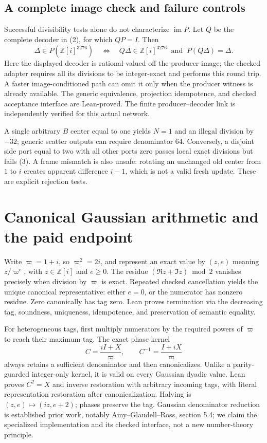 \documentclass[11pt,a4paper]{article}
\newcommand{\Gi}{\mathbb Z[i]}
\newcommand{\pii}{\varpi}
\begin{document}
\subsection*{A complete image check and failure controls}
Successful divisibility tests alone do not characterize $\operatorname{im}P$.
Let $Q$ be the complete decoder in (2), for which $QP=I$. Then
\[
 \Delta\in P(\Gi^{3276})
 \quad\Longleftrightarrow\quad
 Q\Delta\in\Gi^{3276}\ \text{ and }\ P(Q\Delta)=\Delta.\tag{3}
\]
Here the displayed decoder is rational-valued off the producer image;
the checked adapter requires all its divisions to be integer-exact and
performs this round trip. A faster image-conditioned
path can omit it only when the producer witness is already available.
The generic equivalence, projection idempotence, and checked acceptance
interface are Lean-proved. The finite producer--decoder link is independently
verified for this actual network.

A single arbitrary $B$ center equal to one yields $N=1$ and an illegal
division by $-32$; generic scatter outputs can require denominator 64.
Conversely, a disjoint side port equal to two with all other ports zero
passes local exact divisions but fails (3). A frame mismatch is also unsafe:
rotating an unchanged old center from $1$ to $i$ creates apparent difference
$i-1$, which is not a valid fresh update. These are explicit rejection tests.

\section{Canonical Gaussian arithmetic and the paid endpoint}
Write $\pii=1+i$, so $\pii^2=2i$, and represent an exact value by
$(z,e)$ meaning $z/\pii^e$, with $z\in\Gi$ and $e\ge0$.
The residue $(\Re z+\Im z)\bmod2$ vanishes precisely when division by
$\pii$ is exact. Repeated checked cancellation yields the unique canonical
representative: either $e=0$, or the numerator has nonzero residue.
Zero canonically has tag zero. Lean proves termination via the decreasing
tag, soundness, uniqueness, idempotence, and preservation of semantic equality.

For heterogeneous tags, first multiply numerators by the required powers
of $\pii$ to reach their maximum tag. The exact phase kernel
\[
 C=\frac{iI+X}{\pii},\qquad C^{-1}=\frac{I+iX}{\pii}
\]
always retains a sufficient denominator and then canonicalizes. Unlike a
parity-guarded integer-only kernel, it is valid on every Gaussian dyadic
value. Lean proves $C^2=X$ and inverse restoration with arbitrary incoming
tags, with literal representation restoration after canonicalization.
Halving is $(z,e)\mapsto(iz,e+2)$; phases preserve the tag.
Gaussian denominator reduction is established prior work, notably
Amy--Glaudell--Ross, section 5.4; we claim the specialized implementation and
its checked interface, not a new number-theory principle.
\end{document}
